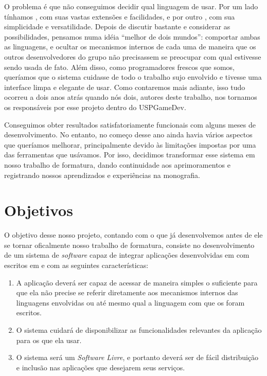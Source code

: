 
O problema é que não conseguimos decidir qual linguagem de \script{} usar.
Por um lado tínhamos , com suas vastas extensões e facilidades, e
por outro , com sua simplicidade e versatilidade. Depois de discutir
bastante e considerar as possibilidades, pensamos numa idéia ``melhor de dois
mundos'': comportar ambas as linguagens, e ocultar os mecanismos internos de
cada uma de maneira que os outros desenvolvedores do grupo não precisassem se
preocupar com qual estivesse sendo usada de fato. Além disso, como programadores
frescos que somos, queríamos que o sistema cuidasse de todo o trabalho sujo
envolvido e tivesse uma interface limpa e elegante de usar. Como contaremos mais
adiante, isso tudo ocorreu a dois anos atrás quando nós dois, autores deste
trabalho, nos tornamos os responsáveis por esse projeto dentro do USPGameDev.

Conseguimos obter resultados satisfatoriamente funcionais com alguns meses de
desenvolvimento. No entanto, no começo desse ano ainda havia vários aspectos que
queríamos melhorar, principalmente devido às limitações impostas por uma das
ferramentas que usávamos. Por isso, decidimos transformar esse sistema em nosso
trabalho de formatura, dando continuidade aos aprimoramentos e registrando
nossos aprendizados e experiências na monografia.

\section{Objetivos}
\label{sec:intr:objetivos}

  O objetivo desse nosso projeto, contando com o que já desenvolvemos antes de
  ele se tornar oficalmente nosso trabalho de formatura, consiste no
  desenvolvimento de um sistema de \textit{software} capaz de integrar
  aplicações desenvolvidas em \CXX{} com  escritos em  e
   com as seguintes características:
  
  \begin{enumerate}

    \item A aplicação deverá ser capaz de acessar  de maneira simples
          o suficiente para que ela não precise se referir diretamente aos
          mecanismos internos das linguagens envolvidas ou até mesmo qual a
          linguagem com que os  foram escritos.
    \item O sistema cuidará de disponibilizar as funcionalidades relevantes da
          aplicação para os  que ela usar.
    \item O sistema será um \textit{Software Livre}, e portanto deverá ser de
          fácil distribuição e inclusão nas aplicações que desejarem seus
          serviços.

  \end{enumerate}

